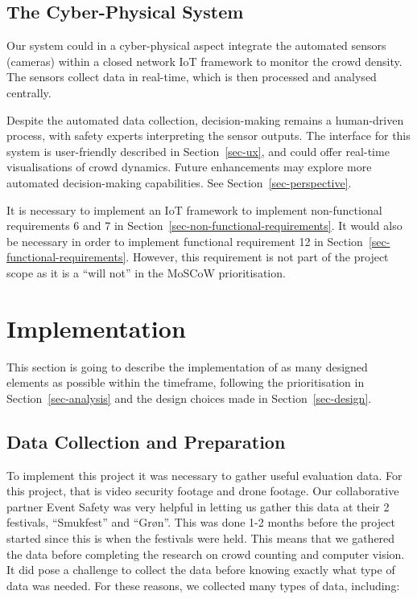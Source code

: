 \documentclass[
]{article}
\begin{document}
\hypertarget{the-cyber-physical-system}{%
\subsection{The Cyber-Physical System}\label{the-cyber-physical-system}}

Our system could in a cyber-physical aspect integrate the automated
sensors (cameras) within a closed network IoT framework to monitor the
crowd density. The sensors collect data in real-time, which is then
processed and analysed centrally.

Despite the automated data collection, decision-making remains a
human-driven process, with safety experts interpreting the sensor
outputs. The interface for this system is user-friendly described in
Section~\ref{sec-ux}, and could offer real-time visualisations of crowd
dynamics. Future enhancements may explore more automated decision-making
capabilities. See Section~\ref{sec-perspective}.

It is necessary to implement an IoT framework to implement
non-functional requirements 6 and 7 in
Section~\ref{sec-non-functional-requirements}. It would also be
necessary in order to implement functional requirement 12 in
Section~\ref{sec-functional-requirements}. However, this requirement is
not part of the project scope as it is a ``will not'' in the MoSCoW
prioritisation.

\newpage{}

\hypertarget{sec-implementation}{%
\section{Implementation}\label{sec-implementation}}

This section is going to describe the implementation of as many designed
elements as possible within the timeframe, following the prioritisation
in Section~\ref{sec-analysis} and the design choices made in
Section~\ref{sec-design}.

\hypertarget{data-collection-and-preparation}{%
\subsection{Data Collection and
Preparation}\label{data-collection-and-preparation}}

To implement this project it was necessary to gather useful evaluation
data. For this project, that is video security footage and drone
footage. Our collaborative partner Event Safety was very helpful in
letting us gather this data at their 2 festivals, ``Smukfest'' and
``Grøn''. This was done 1-2 months before the project started since this
is when the festivals were held. This means that we gathered the data
before completing the research on crowd counting and computer vision. It
did pose a challenge to collect the data before knowing exactly what
type of data was needed. For these reasons, we collected many types of
data, including:
\end{document}
